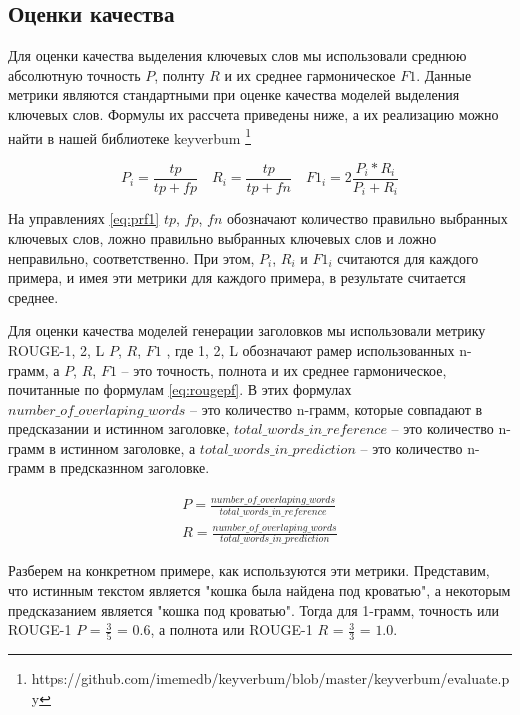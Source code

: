 \documentclass[14pt]{matmex-diploma-custom}
\begin{document}
\subsection{Оценки качества}
Для оценки качества выделения ключевых слов мы использовали среднюю абсолютную точность $P$, полнту $R$ и их среднее гармоническое $F1$.
Данные метрики являются стандартными при оценке качества моделей выделения ключевых слов.
Формулы их рассчета приведены ниже, а их реализацию можно найти в нашей библиотеке keyverbum \footnote{https://github.com/imemedb/keyverbum/blob/master/keyverbum/evaluate.py}

\begin{equation}\label{eq:prf1}
    P_{i} = \frac{tp}{tp + fp} \quad R_{i} = \frac{tp}{tp + fn} \quad F1_{i}=2\frac{P_{i}*R_{i}}{P_{i}+R_{i}}
\end{equation}

На управлениях \ref{eq:prf1} $tp$, $fp$, $fn$ обозначают количество правильно выбранных ключевых слов, ложно правильно выбранных ключевых слов и ложно неправильно, соответственно.
При этом, $P_i$, $R_i$ и $F1_i$ считаются для каждого примера, и имея эти метрики для каждого примера, в результате считается среднее.

Для оценки качества моделей генерации заголовков мы использовали метрику ROUGE-1, 2, L $P$, $R$, $F1$ \cite{Lin:2004}, где 1, 2, L обозначают рамер использованных
n-грамм, а $P$, $R$, $F1$ -- это точность, полнота и их среднее гармоническое, почитанные по формулам \ref{eq:rougepf}. В этих формулах $number\_of\_overlaping\_words$ -- это количество n-грамм, которые совпадают в предсказании и истинном заголовке, $total\_words\_in\_reference$ -- это количество n-грамм в истинном заголовке, а $total\_words\_in\_prediction$ -- это количество n-грамм в предсказнном заголовке.

\begin{equation}\label{eq:rougepf}
\begin{gathered}
P = \frac{number\_of\_overlaping\_words}{total\_words\_in\_reference} \\ 
R = \frac{number\_of\_overlaping\_words}{total\_words\_in\_prediction}
\end{gathered}
\end{equation}

Разберем на конкретном примере, как используются эти метрики. Представим, что истинным текстом является "кошка была найдена под кроватью", а некоторым предсказанием является "кошка под кроватью".
Тогда для 1-грамм, точность или ROUGE-1 $P$ = $\frac{3}{5}$ = $0.6$, а полнота или ROUGE-1 $R$ = $\frac{3}{3}$ = $1.0$.
\end{document}
